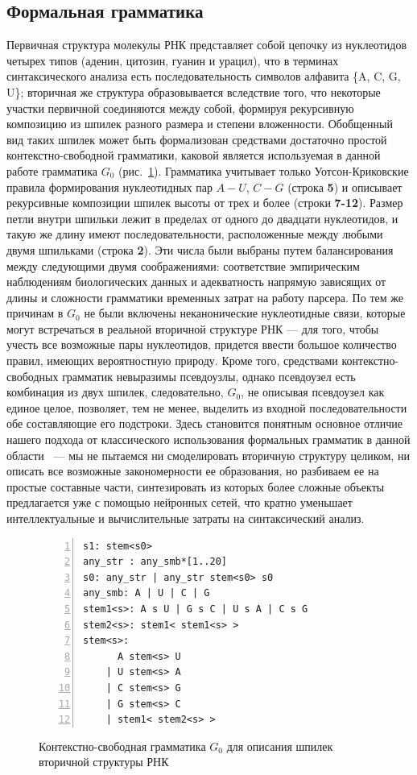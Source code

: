 \subsection{Формальная грамматика}
Первичная структура молекулы РНК представляет собой цепочку из нуклеотидов четырех типов (аденин, цитозин, гуанин и урацил), что в терминах синтаксического анализа есть последовательность символов алфавита \{A, C, G, U\}; вторичная же структура образовывается вследствие того, что некоторые участки первичной соединяются между собой, формируя рекурсивную композицию из шпилек разного размера и степени вложенности. Обобщенный вид таких шпилек может быть формализован средствами достаточно простой контекстно-свободной грамматики, каковой является используемая в данной работе грамматика $G_0$ (рис.~\ref{gram}). Грамматика учитывает только Уотсон-Криковские правила формирования нуклеотидных пар $A-U$, $C-G$ (строка \textbf{5}) и описывает рекурсивные композиции шпилек высоты от трех и более (строки \textbf{7-12}). Размер петли внутри шпильки лежит в пределах от одного до двадцати нуклеотидов, и такую же длину имеют последовательности, расположенные между любыми двумя шпильками (строка \textbf{2}). Эти числа были выбраны путем балансирования между следующими двумя соображениями: соответствие эмпирическим наблюдениям биологических данных и адекватность напрямую зависящих от длины и сложности грамматики временных затрат на работу парсера. По тем же причинам в $G_0$ не были включены неканонические нуклеотидные связи, которые могут встречаться в реальной вторичной структуре РНК --- для того, чтобы учесть все возможные пары нуклеотидов, придется ввести большое количество правил, имеющих вероятностную природу. Кроме того, средствами контекстно-свободных грамматик невыразимы псевдоузлы, однако псевдоузел есть комбинация из двух шпилек, следовательно, $G_0$, не описывая псевдоузел как единое целое, позволяет, тем не менее, выделить из входной последовательности обе составляющие его подстроки. Здесь становится понятным основное отличие нашего подхода от классического использования формальных грамматик в данной области~\cite{knudsen1999rna,dowell2004evaluation,rivas2000language} --- мы не пытаемся ни смоделировать вторичную структуру целиком, ни описать все возможные закономерности ее образования, но разбиваем ее на простые составные части, синтезировать из которых более сложные объекты предлагается уже с помощью нейронных сетей, что кратно уменьшает интеллектуальные и вычислительные затраты на синтаксический анализ.

\begin{figure}[h]
\begin{Verbatim}[numbers=left,xleftmargin=5mm]
s1: stem<s0>
any_str : any_smb*[1..20]
s0: any_str | any_str stem<s0> s0
any_smb: A | U | C | G
stem1<s>: A s U | G s C | U s A | C s G 
stem2<s>: stem1< stem1<s> >
stem<s>:  
      A stem<s> U 
    | U stem<s> A 
    | C stem<s> G 
    | G stem<s> C 
    | stem1< stem2<s> >  
\end{Verbatim}
\caption{Контекстно-свободная грамматика $G_0$ для описания шпилек вторичной структуры РНК}
\label{gram}
\end{figure}


